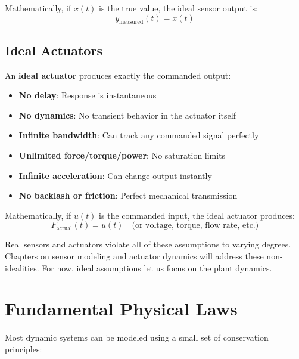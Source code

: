 Mathematically, if $x(t)$ is the true value, the ideal sensor output is:
\begin{equation}
y_{\text{measured}}(t) = x(t)
\end{equation}

\section{Ideal Actuators}

An \textbf{ideal actuator} produces exactly the commanded output:

\begin{itemize}
    \item \textbf{No delay}: Response is instantaneous
    \item \textbf{No dynamics}: No transient behavior in the actuator itself
    \item \textbf{Infinite bandwidth}: Can track any commanded signal perfectly
    \item \textbf{Unlimited force/torque/power}: No saturation limits
    \item \textbf{Infinite acceleration}: Can change output instantly
    \item \textbf{No backlash or friction}: Perfect mechanical transmission
\end{itemize}

Mathematically, if $u(t)$ is the commanded input, the ideal actuator produces:
\begin{equation}
F_{\text{actual}}(t) = u(t) \quad \text{(or voltage, torque, flow rate, etc.)}
\end{equation}

\begin{warningbox}
Real sensors and actuators violate all of these assumptions to varying degrees. Chapters on sensor modeling and actuator dynamics will address these non-idealities. For now, ideal assumptions let us focus on the plant dynamics.
\end{warningbox}

\chapter{Fundamental Physical Laws}
\label{ch:physical_laws}

Most dynamic systems can be modeled using a small set of conservation principles:

